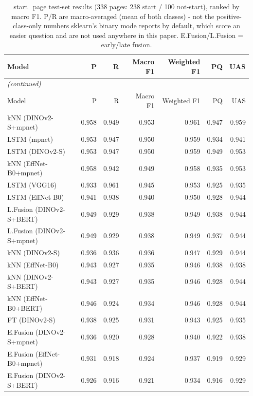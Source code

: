 \begin{longtable}{lrrrrrr}
\caption{start\_page test-set results (338 pages: 238 start / 100 not-start), ranked by macro F1. P/R are macro-averaged (mean of both classes) - not the positive-class-only numbers sklearn's binary mode reports by default, which score an easier question and are not used anywhere in this paper. E.Fusion/L.Fusion = early/late fusion.} \label{tab:results-start-page} \\
\toprule
Model & P & R & Macro F1 & Weighted F1 & PQ & UAS \\
\midrule
\endfirsthead
\multicolumn{7}{l}{\small\itshape (continued)} \\
\toprule
Model & P & R & Macro F1 & Weighted F1 & PQ & UAS \\
\midrule
\endhead
\bottomrule
\endfoot
kNN (DINOv2-S+mpnet) & 0.958 & 0.949 & 0.953 & 0.961 & 0.947 & 0.959 \\
LSTM (mpnet) & 0.953 & 0.947 & 0.950 & 0.959 & 0.934 & 0.941 \\
LSTM (DINOv2-S) & 0.953 & 0.947 & 0.950 & 0.959 & 0.949 & 0.953 \\
kNN (EffNet-B0+mpnet) & 0.958 & 0.942 & 0.949 & 0.958 & 0.935 & 0.953 \\
LSTM (VGG16) & 0.933 & 0.961 & 0.945 & 0.953 & 0.925 & 0.935 \\
LSTM (EffNet-B0) & 0.941 & 0.938 & 0.940 & 0.950 & 0.928 & 0.944 \\
L.Fusion (DINOv2-S+BERT) & 0.949 & 0.929 & 0.938 & 0.949 & 0.938 & 0.944 \\
L.Fusion (DINOv2-S+mpnet) & 0.949 & 0.929 & 0.938 & 0.949 & 0.937 & 0.944 \\
kNN (DINOv2-S) & 0.936 & 0.936 & 0.936 & 0.947 & 0.929 & 0.944 \\
kNN (EffNet-B0) & 0.943 & 0.927 & 0.935 & 0.946 & 0.938 & 0.938 \\
kNN (DINOv2-S+BERT) & 0.943 & 0.927 & 0.935 & 0.946 & 0.928 & 0.944 \\
kNN (EffNet-B0+BERT) & 0.946 & 0.924 & 0.934 & 0.946 & 0.928 & 0.944 \\
FT (DINOv2-S) & 0.938 & 0.925 & 0.931 & 0.943 & 0.925 & 0.935 \\
E.Fusion (DINOv2-S+mpnet) & 0.936 & 0.920 & 0.928 & 0.940 & 0.922 & 0.938 \\
E.Fusion (EffNet-B0+mpnet) & 0.931 & 0.918 & 0.924 & 0.937 & 0.919 & 0.929 \\
E.Fusion (DINOv2-S+BERT) & 0.926 & 0.916 & 0.921 & 0.934 & 0.916 & 0.929 \\

\end{longtable}
